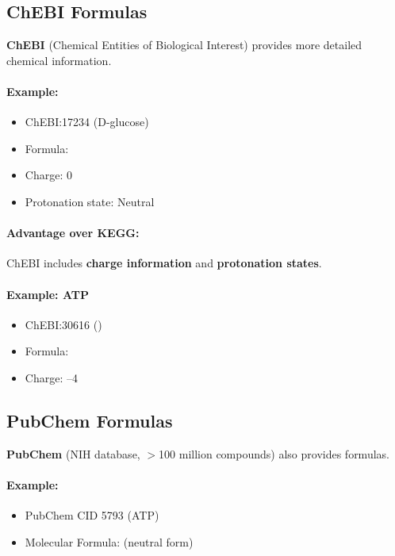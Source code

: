 \subsection{ChEBI Formulas}
\label{subsec:chebi-integration}

\textbf{ChEBI} (Chemical Entities of Biological Interest) provides more detailed chemical information.

\paragraph{Example:}
\begin{itemize}
    \item ChEBI:17234 (D-glucose)
    \item Formula: 
    \item Charge: 0
    \item Protonation state: Neutral
\end{itemize}

\paragraph{Advantage over KEGG:} ChEBI includes \textbf{charge information} and \textbf{protonation states}.

\paragraph{Example: ATP}
\begin{itemize}
    \item ChEBI:30616 ()
    \item Formula: 
    \item Charge: --4
\end{itemize}

\subsection{PubChem Formulas}
\label{subsec:pubchem-integration}

\textbf{PubChem} (NIH database, $>$100 million compounds) also provides formulas.

\paragraph{Example:}
\begin{itemize}
    \item PubChem CID 5793 (ATP)
    \item Molecular Formula:  (neutral form)
\end{itemize}

